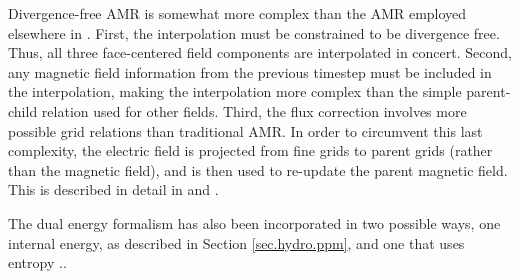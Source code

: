 Divergence-free AMR is somewhat more complex than the AMR employed
elsewhere in \enzo.  First, the interpolation must be constrained to be
divergence free.  Thus, all three face-centered field components are
interpolated in concert.  Second, any magnetic field information from
the previous timestep must be included in the interpolation, making the
interpolation more complex than the simple parent-child relation used
for other fields.  Third, the flux correction involves more possible
grid relations than traditional AMR.  In order to circumvent this last
complexity, the electric field is projected from fine grids to parent
grids (rather than the magnetic field), and is then used to re-update
the parent magnetic field.  This is described in detail in
\citet{Balsara99} and \citet{Collins10}.


The dual energy formalism has also been incorporated in two possible ways, one internal
energy, as described in Section \ref{sec.hydro.ppm}, and one that
uses entropy \cite{TVD93, Collins10}..  

%

